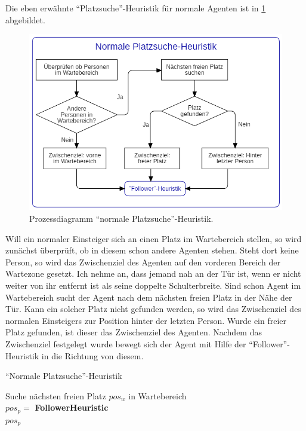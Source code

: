 Die eben erwähnte "`Platzsuche"'-Heuristik für normale Agenten ist in \figurename \ref{fig:NPH} abgebildet.
\begin{figure}[H]
	\centering
		\includegraphics[width=1.0\textwidth]{pictures/model/algorithm/boarding/normal_boarding/normal_space_find_heuristic.png}
	\caption{Prozessdiagramm "`normale Platzsuche"'-Heuristik.}
	\label{fig:NPH}
\end{figure}
Will ein normaler Einsteiger sich an einen Platz im Wartebereich stellen, so wird zunächst überprüft, ob in diesem schon andere Agenten stehen. Steht dort keine Person, so wird das Zwischenziel des Agenten auf den vorderen Bereich der Wartezone gesetzt. Ich nehme an, dass jemand nah an der Tür ist, wenn er nicht weiter von ihr entfernt ist als seine doppelte Schulterbreite. Sind schon Agent im Wartebereich sucht der Agent nach dem nächsten freien Platz in der Nähe der Tür. Kann ein solcher Platz nicht gefunden werden, so wird das Zwischenziel des normalen Einsteigers zur Position hinter der letzten Person. Wurde ein freier Platz gefunden, ist dieser das Zwischenziel des Agenten. Nachdem das Zwischenziel festgelegt wurde bewegt sich der Agent mit Hilfe der "`Follower"'-Heuristik in die Richtung von diesem.
\clearpage
\begin{algorithm} [H]
	\caption{"`Normale Platzsuche"'-Heuristik}
	
	\normalSpaceFindHeuristic{} {
		 {
			Suche nächsten freien Platz $pos_w$ in Wartebereich \\
		} 
		$pos_p = $ \textbf{FollowerHeuristic} \\
		\Return $pos_p$
	}
\end{algorithm}

